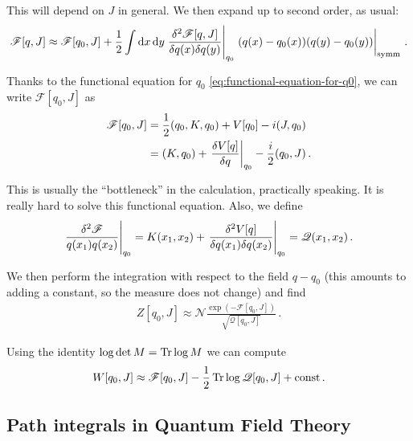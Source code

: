 \documentclass[main.tex]{subfiles}
\begin{document}
This will depend on \(J\) in general. We then expand up to second order, as usual: 
%
\begin{align}
\mathscr{F}[q, J] \approx \mathscr{F}[q_0 , J] + \frac{1}{2} \int \dd{x} \dd{y} \eval{\frac{ \delta^2 \mathscr{F}[q, J]}{ \delta q(x) \delta q(y) }}_{q_0 } \eval{(q(x) - q_0 (x)) (q(y) - q_0 (y))}_{\text{symm}}
\,.
\end{align}

Thanks to the functional equation for \(q_0 \) \eqref{eq:functional-equation-for-q0}, we can write \(\mathscr{F}[q_0 , J]\) as 
%
\begin{align}
\mathscr{F}[q_0 , J] &= \frac{1}{2} (q_0 , K, q_0 ) + V[q_0 ] - i (J, q_0 )  \\
&= (K, q_0 ) + \eval{\fdv{V[q]}{q}}_{q_0 } - \frac{i}{2}  (q_0, J) 
\,.
\end{align}
%

This is usually the ``bottleneck'' in the calculation, practically speaking. It is really hard to solve this functional equation.
Also, we define
%
\begin{align}
\eval{\frac{ \delta^2 \mathscr{F}}{q(x_1 ) q(x_2 )}}_{q_0 }
= K(x_1 , x_2 ) + \eval{\frac{ \delta^2 V[q]}{ \delta q(x_1 ) \delta q(x_2 )}}_{q_0 } = \mathscr{Q}(x_1 , x_2 )
\,.
\end{align}


We then perform the integration with respect to the field \(q - q_0 \) (this amounts to adding a constant, so the measure does not change) and find 
%
\begin{align}
Z[q_0 , J] \approx \mathscr{N}\frac{\exp(- \mathscr{F}[q_0, J ])}{\sqrt{\mathscr{Q} [q_0, J]}}
\,.
\end{align}

Using the identity \(\log \det M = \Tr \log M\) we can compute 
%
\begin{align}
W[q_0 , J] \approx \mathscr{F}[q_0 , J] - \frac{1}{2} \Tr \log \mathscr{Q}[q_0, J] + \text{const}
\,.
\end{align}

\subsection{Path integrals in Quantum Field Theory}
\end{document}
